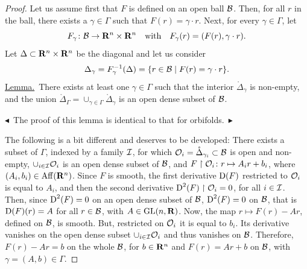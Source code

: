 \begin{proof}
  Let us assume first that $F$ is defined on an open ball $\mathcal{B}$.
  Then,
  for all $r$ in the ball,
  there exists a $\gamma \in \Gamma$ such that $F(r) = \gamma\cdot r$.
  Next,
  for every $\gamma \in \Gamma$, let
  \[
    F_\gamma \colon \mathcal{B} \to \mathbf{R}^n \times \mathbf{R}^n \quad \mbox{with} \quad F_\gamma(r) = (F(r), \gamma\cdot r).
    \]
  Let $\Delta \subset \mathbf{R}^n \times \mathbf{R}^n$ be the diagonal and let us consider
  \[
    \Delta_\gamma = F_\gamma^{-1}(\Delta) = \{ r \in \mathcal{B} \mid F(r) = \gamma\cdot r \}.
    \]
  \uline{Lemma.}~There exists at least one $\gamma \in \Gamma$ such that the interior $\mathring{\Delta}_\gamma$ is non-empty,
  and the union $\mathring{\Delta}_\Gamma = \cup_{\gamma \in \Gamma} \mathring{\Delta}_\gamma$ is an open dense subset of $\mathcal{B}$.
  
  $\blacktriangleleft$~The proof of this lemma is identical to that for orbifolds.~$\blacktriangleright$
  
  The following is a bit different and deserves to be developed:
  There exists a subset of $\Gamma$,
  indexed by a family $\mathcal{I}$,
  for which $\mathcal{O}_i = \mathring{\Delta}_{\gamma_i} \subset \mathcal{B}$ is open and non-empty,
  $\cup_{i \in \mathcal{I}} \mathcal{O}_i$ is an open dense subset of $\mathcal{B}$,
  and $F \restriction \mathcal{O}_i \colon r \mapsto A_i r + b_i$,
  where $(A_i,b_i) \in \operatorname{Aff}(\mathbf{R}^n)$.
  Since $F$ is smooth,
  the first derivative $\operatorname{D}(F)$ restricted to $\mathcal{O}_i$ is equal to $A_i$,
  and then the second derivative $\operatorname{D}^2(F) \restriction \mathcal{O}_i = 0$,
  for all $i \in \mathcal{I}$.
  Then,
  since $\operatorname{D}^2(F) = 0$ on an open dense subset of $\mathcal{B}$,
  $\operatorname{D}^2(F) = 0$ on $\mathcal{B}$,
  that is $\operatorname{D}(F)(r) = A$ for all $r \in \mathcal{B}$,
  with $A \in \mathrm{GL}(n,\mathbf{R})$.
  Now,
  the map $r \mapsto F(r) - A r $,
  defined on $\mathcal{B}$,
  is smooth.
  But,
  restricted on $\mathcal{O}_i$ it is equal to $b_i$.
  Its derivative vanishes on the open dense subset $\cup_{i \in \mathcal{I}} \mathcal{O}_i$ and thus vanishes on $\mathcal{B}$.
  Therefore,
  $F(r) - A r = b$ on the whole $\mathcal{B}$,
  for $b \in \mathbf{R}^n$
  and $F(r) = A r + b$ on $\mathcal{B}$,
  with $\gamma = (A,b) \in \Gamma$.
\end{proof}


